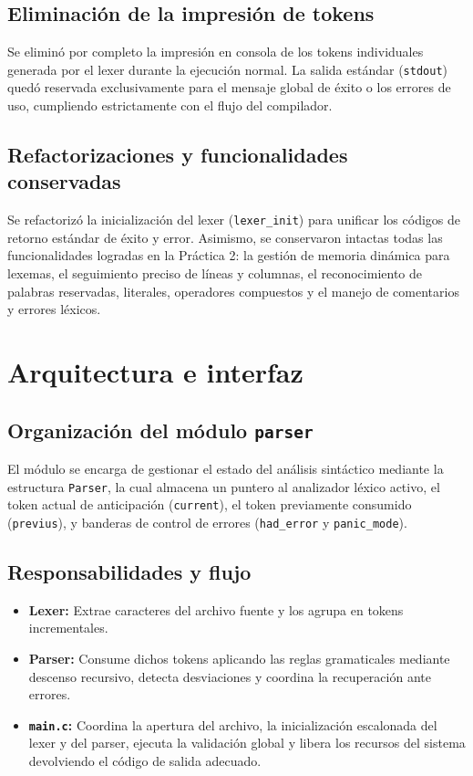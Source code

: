 \documentclass[12pt, letterpaper]{article}
\begin{document}
\subsection{Eliminación de la impresión de tokens}
Se eliminó por completo la impresión en consola de los tokens individuales generada por el lexer durante la ejecución normal. La salida estándar (\texttt{stdout}) quedó reservada exclusivamente para el mensaje global de éxito o los errores de uso, cumpliendo estrictamente con el flujo del compilador.

\subsection{Refactorizaciones y funcionalidades conservadas}
Se refactorizó la inicialización del lexer (\texttt{lexer\_init}) para unificar los códigos de retorno estándar de éxito y error. Asimismo, se conservaron intactas todas las funcionalidades logradas en la Práctica 2: la gestión de memoria dinámica para lexemas, el seguimiento preciso de líneas y columnas, el reconocimiento de palabras reservadas, literales, operadores compuestos y el manejo de comentarios y errores léxicos.

\section{Arquitectura e interfaz}

\subsection{Organización del módulo \texttt{parser}}
El módulo se encarga de gestionar el estado del análisis sintáctico mediante la estructura \texttt{Parser}, la cual almacena un puntero al analizador léxico activo, el token actual de anticipación (\texttt{current}), el token previamente consumido (\texttt{previus}), y banderas de control de errores (\texttt{had\_error} y \texttt{panic\_mode}).

\subsection{Responsabilidades y flujo}
\begin{itemize}
    \item \textbf{Lexer:} Extrae caracteres del archivo fuente y los agrupa en tokens incrementales.
    \item \textbf{Parser:} Consume dichos tokens aplicando las reglas gramaticales mediante descenso recursivo, detecta desviaciones y coordina la recuperación ante errores.
    \item \textbf{\texttt{main.c}:} Coordina la apertura del archivo, la inicialización escalonada del lexer y del parser, ejecuta la validación global y libera los recursos del sistema devolviendo el código de salida adecuado.
\end{itemize}
\end{document}
